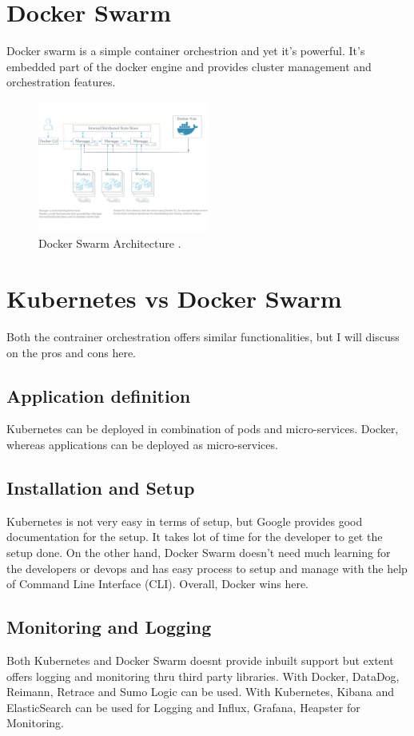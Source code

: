 \documentclass[sigconf]{acmart}
\begin{document}
	\section{Docker Swarm}
	Docker swarm is a simple container orchestrion and yet it's powerful. It's embedded part of the docker engine and provides cluster management 
	and orchestration features.
\begin{figure}
	\includegraphics[width=0.5\textwidth]{images/DockerSwarm}
	\caption{Docker Swarm Architecture \cite{Platform9}.} \label{fig:figure2} 
\end{figure}

\section{Kubernetes vs Docker Swarm}
Both the contrainer orchestration offers similar functionalities, but I will discuss on the pros and cons here.
\cite{kubernetes-vs-docker-swarm}
\subsection{Application definition}
Kubernetes can be deployed in combination of pods and micro-services. Docker, whereas applications can be deployed as micro-services.
\subsection{Installation and Setup}

Kubernetes is not very easy in terms of setup, but Google provides good documentation for the setup. It takes lot of time for the developer to get the setup done.
On the other hand, Docker Swarm doesn't need much learning for the developers or devops and has easy process to setup and manage with the help of Command Line Interface (CLI).
Overall, Docker wins here.

\subsection{Monitoring and Logging}
Both Kubernetes and Docker Swarm doesnt provide inbuilt support but extent offers logging and monitoring thru third party libraries. 
With Docker, DataDog, Reimann, Retrace and Sumo Logic can be used.
With Kubernetes, Kibana and ElasticSearch can be used for Logging and Influx, Grafana, Heapster for Monitoring.
\end{document}
